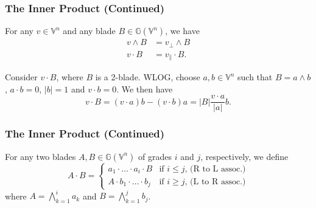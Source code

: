 \documentclass{beamer}
\newcommand{\G}{\mathbb{G}}
\newcommand{\V}{\mathbb{V}}
\begin{document}
\begin{frame}
\frametitle{The Inner Product (Continued)}
\begin{lemma}
For any $v\in\V^n$ and any blade $B\in\G(\V^n)$, we have
\begin{align*}
v\wedge B &= v_{\perp}\wedge B \\
v\cdot B &= v_{\parallel}\cdot B.
\end{align*}
\end{lemma}
\begin{example}
Consider $v\cdot B$, where $B$ is a 2-blade.  WLOG, choose $a,b\in\V^n$ such that
$B=a\wedge b$, $a\cdot b=0$, $|b|=1$ and $v\cdot b=0$.  We then have
\begin{equation*}
v\cdot B = (v\cdot a)b - (v\cdot b)a = |B|\frac{v\cdot a}{|a|}b.
\end{equation*}
\end{example}
\end{frame}

\begin{frame}
\frametitle{The Inner Product (Continued)}
\begin{definition}
For any two blades $A,B\in\G(\V^n)$ of grades $i$ and $j$, respectively, we define
\begin{equation*}
A\cdot B = \left\{
\begin{array}{ll}
a_1\cdot\dots\cdot a_i\cdot B & \mbox{if $i\leq j$, (R to L assoc.)} \\
A\cdot b_1\cdot\dots\cdot b_j & \mbox{if $i\geq j$, (L to R assoc.)}
\end{array}
\right.
\end{equation*}
where $A=\bigwedge_{k=1}^i a_k$ and $B=\bigwedge_{k=1}^j b_j$.
\end{definition}
\end{frame}
\end{document}
